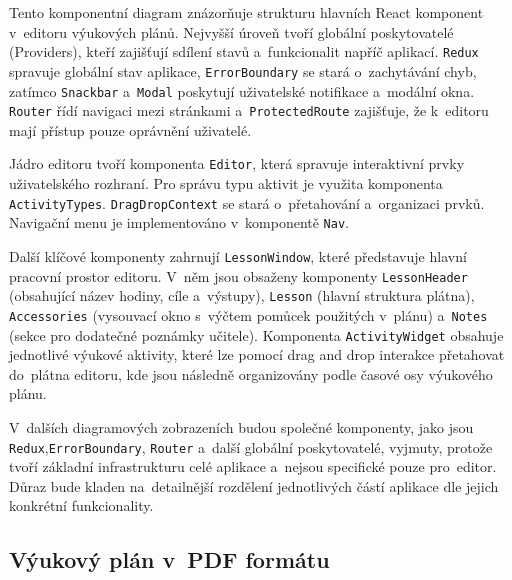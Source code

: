 \documentclass[male,czech,api_bc]{kitheses}
\begin{document}
\newpage

Tento komponentní diagram znázorňuje strukturu hlavních React komponent v~editoru výukových plánů. Nejvyšší úroveň tvoří globální poskytovatelé (Providers), kteří zajišťují sdílení stavů a~funkcionalit napříč aplikací. \texttt{Redux} spravuje globální stav aplikace, \texttt{ErrorBoundary} se stará o~zachytávání chyb, zatímco \texttt{Snackbar} a~\texttt{Modal} poskytují uživatelské notifikace a~modální okna. \texttt{Router} řídí navigaci mezi stránkami a~\texttt{ProtectedRoute} zajišťuje, že k~editoru mají přístup pouze oprávnění uživatelé.

Jádro editoru tvoří komponenta \texttt{Editor}, která spravuje interaktivní prvky uživatelského rozhraní. Pro správu typu aktivit je využita komponenta \texttt{ActivityTypes}. \texttt{DragDropContext} se stará o~přetahování a~organizaci prvků. Navigační menu je implementováno v~komponentě \texttt{Nav}.

Další klíčové komponenty zahrnují \texttt{LessonWindow}, které představuje hlavní pracovní prostor editoru. V~něm jsou obsaženy komponenty \texttt{LessonHeader} (obsahující název hodiny, cíle a~výstupy), \texttt{Lesson} (hlavní struktura plátna), \texttt{Accessories} (vysouvací okno s~výčtem pomůcek použitých v~plánu) a~\texttt{Notes} (sekce pro dodatečné poznámky učitele). Komponenta \texttt{ActivityWidget} obsahuje jednotlivé výukové aktivity, které lze pomocí drag and drop interakce přetahovat do~plátna editoru, kde jsou následně organizovány podle časové osy výukového plánu.

V~dalších diagramových zobrazeních budou společné komponenty, jako jsou \texttt{Redux},\break\texttt{ErrorBoundary}, \texttt{Router} a~další globální poskytovatelé, vyjmuty, protože tvoří základní infrastrukturu celé aplikace a~nejsou specifické pouze pro~editor. Důraz bude kladen na~detailnější rozdělení jednotlivých částí aplikace dle jejich konkrétní funkcionality.

\subsection{Výukový plán v~PDF formátu}
\end{document}
